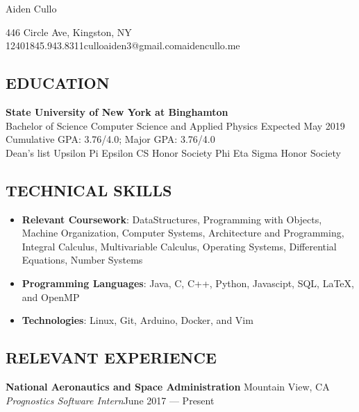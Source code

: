 \documentclass[11pt]{article}
\begin{document}
\centerline{\Huge Aiden Cullo}
\vspace{5mm}
\centerline{\small446 Circle Ave, Kingston, NY 12401\hspace{2mm}\textbar\hspace{2mm}845.943.8311\hspace{2mm}\textbar\hspace{2mm}culloaiden3@gmail.com\hspace{2mm}\textbar\hspace{2mm}aidencullo.me}
\vspace{4mm}
\subsection*{EDUCATION}
\vspace{1mm}
\spacedhrule{0.1em}{0.9em}
\textbf{State University of New York at Binghamton} \\ 
Bachelor of Science Computer Science and Applied Physics Expected May 2019 \\
Cumulative GPA: 3.76/4.0;  Major GPA: 3.76/4.0\\
Dean’s list \sbull Upsilon Pi Epsilon CS Honor Society \sbull Phi Eta Sigma Honor Society \\

\vspace{4mm}
\subsection*{TECHNICAL SKILLS}
\vspace{1mm}
\spacedhrule{0.1em}{0.9em}
\begin{itemize}
  \item \textbf{Relevant Coursework}: DataStructures, Programming with Objects, Machine Organization, Computer Systems, Architecture and Programming, Integral Calculus, Multivariable Calculus, Operating Systems, Differential Equations, Number Systems
  \item	\textbf{Programming Languages}: Java, C, C++, Python, Javascipt, SQL, \LaTeX, and OpenMP
  \item \textbf{Technologies}: Linux, Git, Arduino, Docker, and Vim
\end{itemize}
\vspace{4mm}
\subsection*{RELEVANT EXPERIENCE}
\vspace{1mm}
\spacedhrule{0.1em}{0.9em}
\textbf{National Aeronautics and Space Administration\hfill} Mountain View, CA 
\textit{Prognostics Software Intern}\hfill June 2017 — Present
\end{document}
